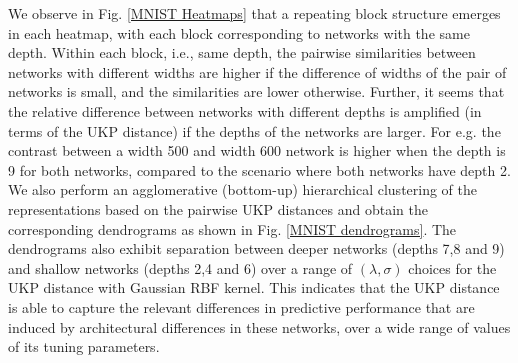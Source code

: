 \documentclass[11pt]{article}
\newcommand{\metricstname}{UKP }
\theoremstyle{plain}
\begin{document}
We observe in Fig. \ref{MNIST Heatmaps} that a repeating block structure emerges in each heatmap, with each block corresponding to networks with the same depth. Within each block, i.e., same depth, the pairwise similarities between networks with different widths are higher if the difference of widths of the pair of networks is small, and the similarities are lower otherwise. Further, it seems that the relative difference between networks with different depths is amplified (in terms of the \metricstname distance) if the depths of the networks are larger. For e.g. the contrast between a width 500 and width 600 network is higher when the depth is 9 for both networks, compared to the scenario where both networks have depth 2. We also perform an agglomerative (bottom-up) hierarchical clustering of the representations based on the pairwise \metricstname distances and obtain the corresponding dendrograms as shown in Fig. \ref{MNIST dendrograms}. The dendrograms also exhibit separation between deeper networks (depths 7,8 and 9) and shallow networks (depths 2,4 and 6) over a range of $(\lambda,\sigma)$ choices for the \metricstname distance with Gaussian RBF kernel. This indicates that the \metricstname distance is able to capture the relevant differences in predictive performance that are induced by architectural differences in these networks, over a wide range of values of its tuning parameters.
\end{document}

